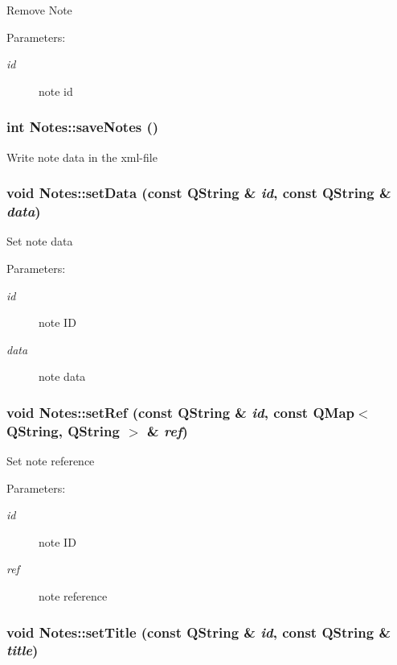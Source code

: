 Remove Note \begin{Desc}
\item[Parameters:]
\begin{description}
\item[{\em id}]note id \end{description}
\end{Desc}
\hypertarget{classNotes_f76c3652cd25371b7233eb84079b39a0}{
\subsubsection[{saveNotes}]{\setlength{\rightskip}{0pt plus 5cm}int Notes::saveNotes ()}}
\label{classNotes_f76c3652cd25371b7233eb84079b39a0}


Write note data in the xml-file \hypertarget{classNotes_176683f801c998ff85f667947c41c7d9}{
\subsubsection[{setData}]{\setlength{\rightskip}{0pt plus 5cm}void Notes::setData (const QString \& {\em id}, \/  const QString \& {\em data})}}
\label{classNotes_176683f801c998ff85f667947c41c7d9}


Set note data \begin{Desc}
\item[Parameters:]
\begin{description}
\item[{\em id}]note ID \item[{\em data}]note data \end{description}
\end{Desc}
\hypertarget{classNotes_d42175f40ec450badc4ed396229a3246}{
\subsubsection[{setRef}]{\setlength{\rightskip}{0pt plus 5cm}void Notes::setRef (const QString \& {\em id}, \/  const QMap$<$ QString, QString $>$ \& {\em ref})}}
\label{classNotes_d42175f40ec450badc4ed396229a3246}


Set note reference \begin{Desc}
\item[Parameters:]
\begin{description}
\item[{\em id}]note ID \item[{\em ref}]note reference \end{description}
\end{Desc}
\hypertarget{classNotes_ce9ed14dfa9f9ca785070b70a06deec3}{
\subsubsection[{setTitle}]{\setlength{\rightskip}{0pt plus 5cm}void Notes::setTitle (const QString \& {\em id}, \/  const QString \& {\em title})}}
\label{classNotes_ce9ed14dfa9f9ca785070b70a06deec3}



